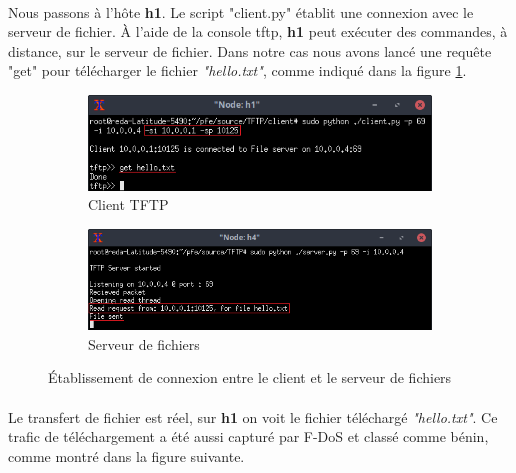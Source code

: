 \paragraph{}
Nous passons à l'hôte \textbf{h1}. Le script "client.py" établit une connexion avec le serveur de fichier. À l'aide de la console tftp, \textbf{h1} peut exécuter des commandes,  à distance, sur le serveur de fichier. Dans notre cas nous avons lancé une requête "get" pour télécharger le fichier \textit{"hello.txt"}, comme indiqué dans la figure \ref{fig:c/s_TFTP}.

\begin{figure}[H]
\centering
\begin{subfigure}{12.5cm}
\centering
\includegraphics[width=\textwidth]{Figures/simulation/mininet/TFTP/client/benign}
\caption{Client TFTP}
\end{subfigure}
\vskip 0.4cm
\begin{subfigure}{12.5cm}
\centering
\includegraphics[width=\textwidth]{Figures/simulation/mininet/TFTP/server/benign_request}
\caption{Serveur de fichiers}
\end{subfigure}
\vskip 0.3cm
\decoRule
\caption{Établissement de connexion entre le client et le serveur de fichiers}
\label{fig:c/s_TFTP}
\end{figure}
\paragraph{}
Le transfert de fichier est réel, sur \textbf{h1} on voit le fichier téléchargé \textit{"hello.txt"}. Ce trafic de téléchargement a été aussi capturé par F-DoS et classé comme bénin, comme montré dans la figure suivante.

